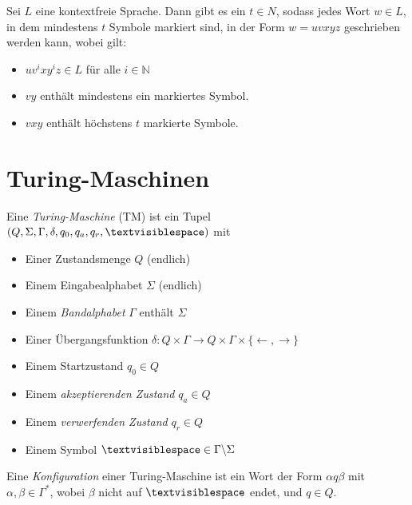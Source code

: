 \documentclass{cheat-sheet}
\begin{document}

\begin{satz}
Sei $L$ eine kontextfreie Sprache. Dann gibt es ein $t \in N$, sodass jedes Wort $w \in L$, in dem mindestens $t$ Symbole markiert sind, in der Form $w = uvxyz$ geschrieben werden kann, wobei gilt:

\begin{itemize}
  \item $uv^{i}xy^{i}z \in L$ für alle $i \in \mathbb{N}$
  \item $vy$ enthält mindestens ein markiertes Symbol.
  \item $vxy$ enthält höchstens $t$ markierte Symbole.
\end{itemize}
\end{satz}



\section{Turing-Maschinen}

\begin{definition}
Eine \emph{Turing-Maschine} (TM) ist ein Tupel $(Q, \Sigma, \Gamma, \delta, q_{0}, q_{a}, q_{r}, \textvisiblespace)$ mit

\begin{itemize}{\leftmargin=0em}
  \setlength{\leftmargin}{0pt}
  \item Einer Zustandsmenge $Q$ (endlich)
  \item Einem Eingabealphabet $\Sigma$ (endlich)
  \item Einem \emph{Bandalphabet} $\Gamma$ enthält $\Sigma$
  \item Einer Übergangsfunktion $\delta : Q \times \Gamma \to Q \times \Gamma \times \{ \leftarrow, \rightarrow \} $
  \item Einem Startzustand $q_{0} \in Q$
  \item Einem \emph{akzeptierenden Zustand} $q_{a} \in Q$
  \item Einem \emph{verwerfenden Zustand} $q_{r} \in Q$
  \item Einem Symbol $\textvisiblespace \in \Gamma \backslash \Sigma$
\end{itemize}
\end{definition}

\begin{definition}
Eine \emph{Konfiguration} einer Turing-Maschine ist ein Wort der Form $\alpha q \beta$ mit $\alpha, \beta \in \Gamma^{*}$, wobei $\beta$ nicht auf $\textvisiblespace$ endet, und $q \in Q$.
\end{definition}
\end{document}
